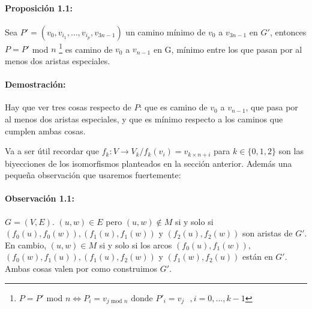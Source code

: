 \paragraph*{Proposición 1.1: } 
Sea $P'=(v_0, v_{i_1},\dots, v_{i_p}, v_{3n-1})$ un camino mínimo de $v_0$ a $v_{3n-1}$ en $G'$, entonces $P = P'$ mod $n$ \footnote{$P = P'$ mod $n \Leftrightarrow P_i = v_{j\text{ mod }n}\text{ donde $P'_i=v_j$ }, i = 0,\dots, k-1$} es camino de $v_0$ a $v_{n-1}$ en G, mínimo entre los que pasan por al menos dos aristas especiales.

\paragraph*{Demostración: }

Hay que ver tres cosas respecto de $P$: que es camino de $v_0$ a $v_{n-1}$, que pasa por al menos dos aristas especiales, y que es mínimo respecto a los caminos que cumplen ambas cosas.

Va a ser útil recordar que $f_k:V\rightarrow V_k/ f_k(v_i) = v_{k\times n + i}$ para $k\in \{0,1,2\}$ son las biyecciones de los isomorfismos planteados en la sección anterior. Además una pequeña observación que usaremos fuertemente: 

\paragraph*{Observación 1.1: }$G=(V,E)$. $(u,w)\in E$ pero $(u,w)\notin M$ si y solo si $(f_0(u), f_0(w)), (f_1(u), f_1(w))$ y $(f_2(u), f_2(w))$ son aristas de $G'$. \\
En cambio, $(u,w)\in M$ si y solo si los arcos $(f_0(u), f_1(w)),$ $(f_0(w), f_1(u)), (f_1(u), f_2(w))$ y $(f_1(w), f_2(u))$ están en $G'$. \\
Ambas cosas valen por como construimos $G'$.

